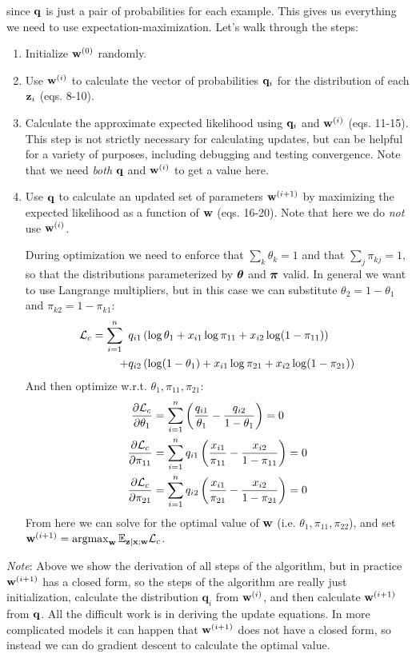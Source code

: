 \documentclass[12pt,letterpaper]{article}
\newcommand{\argmax}{\operatorname{argmax}}
\begin{document}
	since $\mathbf{q}$ is just a pair of probabilities for each example.
This gives us everything we need to use expectation-maximization.
Let's walk through the steps:
\begin{enumerate}
	\item Initialize $\mathbf{w}^{(0)}$ randomly.
	\item Use $\mathbf{w}^{(i)}$ to calculate the vector of probabilities $\mathbf{q}_i$ for the distribution of each $\mathbf{z}_i$ (eqs. 8-10).
	\item Calculate the approximate expected likelihood using $\mathbf{q}_i$ and $\mathbf{w}^{(i)}$ (eqs. 11-15). This step is not strictly necessary for calculating updates, but can be helpful for a variety of purposes, including debugging and testing convergence. Note that we need \emph{both} $\mathbf{q}$ and $\mathbf{w}^{(i)}$ to get a value here.
	\item Use $\mathbf{q}$ to calculate an updated set of parameters $\mathbf{w}^{(i+1)}$ by maximizing the expected likelihood as a function of $\mathbf{w}$ (eqs. 16-20). Note that here we do \emph{not} use $\mathbf{w}^{(i)}$. 
	
	\smallskip
	
	During optimization we need to enforce that $\sum_k \theta_k = 1$ and that $\sum_j \pi_{kj} = 1$, so that the distributions parameterized by $\boldsymbol{\theta}$ and $\boldsymbol{\pi}$ valid. In general we want to use Langrange multipliers, but in this case we can substitute $\theta_2 = 1 - \theta_1$ and $\pi_{k2} = 1 - \pi_{k1}$:
	\begin{align}
	    \mathcal{L}_c = \sum_{i = 1}^n \enspace&q_{i1}\left(\log\theta_1 + x_{i1}\log \pi_{11} + x_{i2}\log (1 - \pi_{11})\right) \\
	    + &q_{i2}\left(\log(1 - \theta_1) + x_{i1}\log \pi_{21} + x_{i2}\log(1 - \pi_{21})\right)
	\end{align}
	And then optimize w.r.t. $\theta_1, \pi_{11}, \pi_{21}$:
	\begin{align}
		\frac{\partial \mathcal{L}_c}{\partial \theta_1} &= \sum_{i = 1}^n \left(\frac{q_{i1}}{\theta_1} - \frac{q_{i2}}{1 - \theta_1}\right) = 0 \\
		\frac{\partial \mathcal{L}_c}{\partial \pi_{11}} &= \sum_{i = 1}^n q_{i1}\left(\frac{x_{i1}}{\pi_{11}} - \frac{x_{i2}}{1 - \pi_{11}}\right) = 0 \\
		\frac{\partial \mathcal{L}_c}{\partial \pi_{21}} &= \sum_{i = 1}^n q_{i2}\left(\frac{x_{i1}}{\pi_{21}} - \frac{x_{i2}}{1 - \pi_{21}}\right) = 0
	\end{align}
	From here we can solve for the optimal value of $\mathbf{w}$ (i.e. $\theta_1, \pi_{11}, \pi_{22}$), and set $\boldw^{(i+1)} = \argmax_{\boldw} \E_{\boldz | \boldx ; \boldw} \mcL_c$.
\end{enumerate}
\emph{Note}: Above we show the derivation of all steps of the algorithm, but in practice $\mathbf{w}^{(i+1)}$ has a closed form, so the steps of the algorithm are really just initialization, calculate the distribution $\mathbf{q}_i$ from $\mathbf{w}^{(i)}$, and then calculate $\mathbf{w}^{(i+1)}$ from $\mathbf{q}$. All the difficult work is in deriving the update equations. In more complicated models it can happen that $\mathbf{w}^{(i+1)}$ does not have a closed form, so instead we can do gradient descent to calculate the optimal value. 
\end{document}

